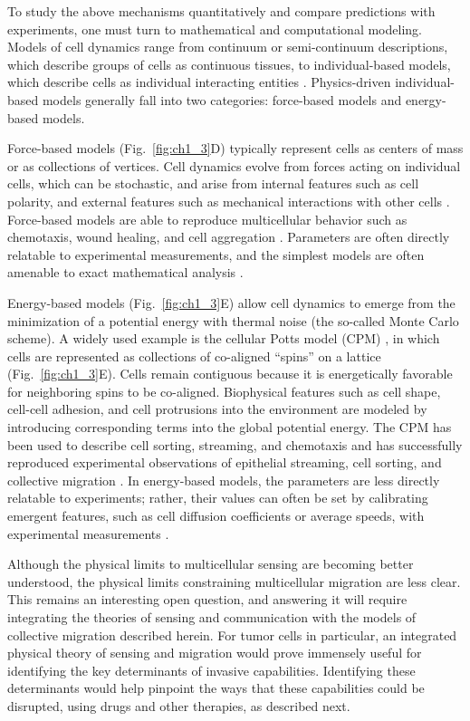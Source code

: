 To study the above mechanisms quantitatively and compare predictions with experiments, one must turn to mathematical and computational modeling. Models of cell dynamics range from continuum or semi-continuum descriptions, which describe groups of cells as continuous tissues, to individual-based models, which describe cells as individual interacting entities \cite{maclaren2015models}. Physics-driven individual-based models generally fall into two categories: force-based models and energy-based models.

Force-based models (Fig.\ \ref{fig:ch1_3}D) typically represent cells as centers of mass or as collections of vertices. Cell dynamics evolve from forces acting on individual cells, which can be stochastic, and arise from internal features such as cell polarity, and external features such as mechanical interactions with other cells \cite{maclaren2015models}.
Force-based models are able to reproduce multicellular behavior such as chemotaxis, wound healing, and cell aggregation \cite{camley2016emergent,basan2013alignment,janulevicius2015short}. Parameters are often directly relatable to experimental measurements, and the simplest models are often amenable to exact mathematical analysis \cite{camley2016emergent}.

Energy-based models (Fig.\ \ref{fig:ch1_3}E) allow cell dynamics to emerge from the minimization of a potential energy with thermal noise (the so-called Monte Carlo scheme). A widely used example is the cellular Potts model (CPM) \cite{graner1992simulation, swat2012multi}, in which cells are represented as collections of co-aligned ``spins'' on a lattice (Fig.\ \ref{fig:ch1_3}E). Cells remain contiguous because it is energetically favorable for neighboring spins to be co-aligned. Biophysical features such as cell shape, cell-cell adhesion, and cell protrusions into the environment are modeled by introducing corresponding terms into the global potential energy.
The CPM has been used to describe cell sorting, streaming, and chemotaxis \cite{maree2007cellular} and has successfully reproduced experimental observations of epithelial streaming, cell sorting, and collective migration \cite{kabla2012collective,maree2007cellular,szabo2010collective}.
In energy-based models, the parameters are less directly relatable to experiments; rather, their values can often be set by calibrating emergent features, such as cell diffusion coefficients or average speeds, with experimental measurements \cite{szabo2010collective}.

Although the physical limits to multicellular sensing are becoming better understood, the physical limits constraining multicellular migration are less clear. This remains an interesting open question, and answering it will require integrating the theories of sensing and communication with the models of collective migration described herein. For tumor cells in particular, an integrated physical theory of sensing and migration would prove immensely useful for identifying the key determinants of invasive capabilities. Identifying these determinants would help pinpoint the ways that these capabilities could be disrupted, using drugs and other therapies, as described next.


